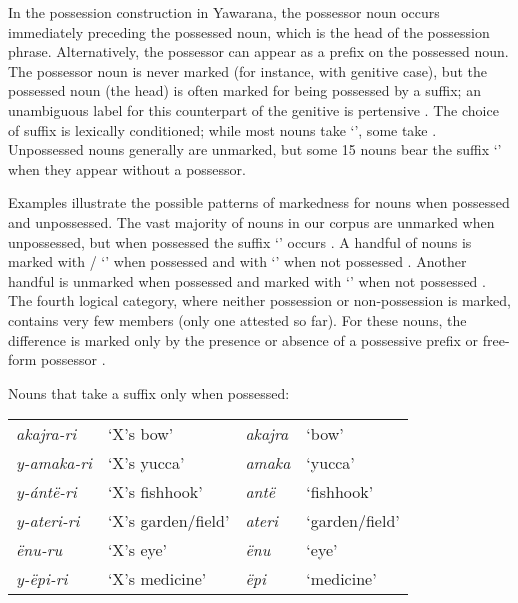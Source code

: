 \documentclass{memoir}
\begin{document}
In the possession construction in Yawarana, the possessor noun occurs
immediately preceding the possessed noun, which is the head of the
possession phrase. Alternatively, the possessor can appear as a prefix
on the possessed noun. The possessor noun is never marked (for instance,
with genitive case), but the possessed noun (the head) is often marked
for being possessed by a suffix; an unambiguous label for this
counterpart of the genitive is pertensive \parencites{dixon2010basic}.
The choice of suffix is lexically conditioned; while most nouns take
 `', some take . Unpossessed nouns generally
are unmarked, but some 15 nouns bear the suffix  `'
when they appear without a possessor.

Examples  illustrate the
possible patterns of markedness for nouns when possessed and
unpossessed. The vast majority of nouns in our corpus are unmarked when
unpossessed, but when possessed the suffix  `' occurs
. A handful of nouns is marked with
/ `' when possessed and with 
`' when not possessed . Another handful
is unmarked when possessed and marked with  `' when
not possessed . The fourth logical category,
where neither possession or non-possession is marked, contains very few
members (only one attested so far). For these nouns, the difference is
marked only by the presence or absence of a possessive prefix or
free-form possessor .

\ex\label{onlypossessed} Nouns that take a suffix only when possessed:

\begin{tabular}[t]{llll}

 \emph{akajra-ri} &          ‘X’s bow’ & \emph{akajra} &          ‘bow’ \\

\emph{y-amaka-ri} &        ‘X’s yucca’ &  \emph{amaka} &        ‘yucca’ \\
 \emph{y-ántë-ri} &     ‘X’s fishhook’ &   \emph{antë} &     ‘fishhook’ \\
\emph{y-ateri-ri} & ‘X’s garden/field’ &  \emph{ateri} & ‘garden/field’ \\
    \emph{ënu-ru} &          ‘X’s eye’ &    \emph{ënu} &          ‘eye’ \\
  \emph{y-ëpi-ri} &     ‘X’s medicine’ &    \emph{ëpi} &     ‘medicine’ \\

\end{tabular}
 \xe
\end{document}
